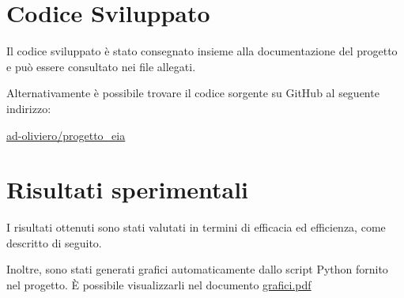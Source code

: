 \documentclass{article}
\begin{document}
\section{Codice Sviluppato}
Il codice sviluppato è stato consegnato insieme alla documentazione del progetto e può essere consultato nei file allegati.

Alternativamente è possibile trovare il codice sorgente su GitHub al seguente indirizzo:

\href{https://github.com/ad-oliviero/progetto_eia}{ad-oliviero/progetto\_eia}


\section{Risultati sperimentali}
I risultati ottenuti sono stati valutati in termini di efficacia ed efficienza, come descritto di seguito.

Inoltre, sono stati generati grafici automaticamente dallo script Python fornito nel progetto.
È possibile visualizzarli nel documento \href{run:grafici.pdf}{grafici.pdf}




\newpage
\nocite{kumar2016edge,kumar2018rev2,jleskovec2009community,klimmt2004introducing,yang2012defining,leskovec2005graphs}
\printbibliography
\end{document}
